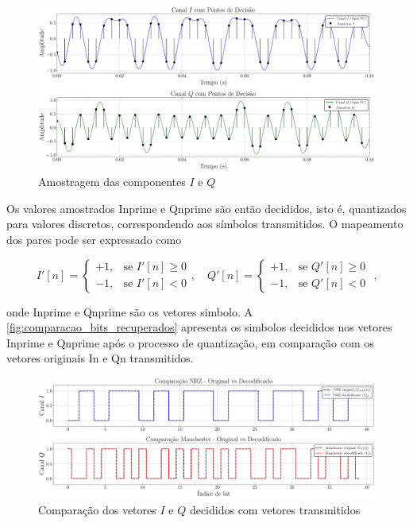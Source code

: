 \begin{figure}[H]
	\centering
	\caption{Amostragem das componentes $I$ e $Q$}\label{fig:sinais_amostrados_pos_filtro_casado}
	\includegraphics[width=\linewidth]{assets/sinais_amostrados_pos_filtro_casado.pdf}
    
\end{figure}

Os valores amostrados \gls{Inprime} e \gls{Qnprime} são então decididos, isto é, quantizados para valores discretos, correspondendo aos símbolos transmitidos. O mapeamento dos pares pode ser expressado como

\begin{equation} 
    I'[n] = \begin{cases}
    +1, & \text{se } I'[n] \geq 0 \\
    -1, & \text{se } I'[n] < 0
    \end{cases}, \quad
    Q'[n] = \begin{cases}
    +1, & \text{se } Q'[n] \geq 0 \\
    -1, & \text{se } Q'[n] < 0
    \end{cases} \text{ ,}
\end{equation}

\noindent onde \gls{Inprime} e \gls{Qnprime} são os vetores simbolo. A \autoref{fig:comparacao_bits_recuperados} apresenta os simbolos decididos nos vetores \gls{Inprime} e \gls{Qnprime} após o processo de quantização, em comparação com os vetores originais \gls{In} e \gls{Qn} transmitidos.

\begin{figure}[H]
	\centering
	\caption{Comparação dos vetores $I$ e $Q$ decididos com vetores transmitidos}\label{fig:comparacao_bits_recuperados}
	\includegraphics[width=\linewidth]{assets/comparacao_bits_recuperados.pdf}
\end{figure}

